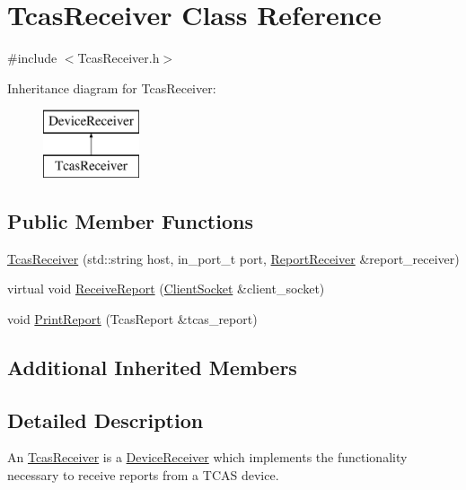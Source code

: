 \hypertarget{class_tcas_receiver}{}\section{Tcas\+Receiver Class Reference}
\label{class_tcas_receiver}


{\ttfamily \#include $<$Tcas\+Receiver.\+h$>$}

Inheritance diagram for Tcas\+Receiver\+:\begin{figure}[H]
\begin{center}
\leavevmode
\includegraphics[height=2.000000cm]{class_tcas_receiver}
\end{center}
\end{figure}
\subsection*{Public Member Functions}
\begin{DoxyCompactItemize}
\item 
\hyperlink{class_tcas_receiver_a7005721ea12880cbf4a90c88e84095f1}{Tcas\+Receiver} (std\+::string host, in\+\_\+port\+\_\+t port, \hyperlink{class_report_receiver}{Report\+Receiver} \&report\+\_\+receiver)
\item 
virtual void \hyperlink{class_tcas_receiver_af888383db22a323d0fa86844537b9b5f}{Receive\+Report} (\hyperlink{class_client_socket}{Client\+Socket} \&client\+\_\+socket)
\item 
void \hyperlink{class_tcas_receiver_a088b1794631926cd91f5befaac1e3510}{Print\+Report} (Tcas\+Report \&tcas\+\_\+report)
\end{DoxyCompactItemize}
\subsection*{Additional Inherited Members}


\subsection{Detailed Description}
An \hyperlink{class_tcas_receiver}{Tcas\+Receiver} is a \hyperlink{class_device_receiver}{Device\+Receiver} which implements the functionality necessary to receive reports from a T\+C\+A\+S device. 

